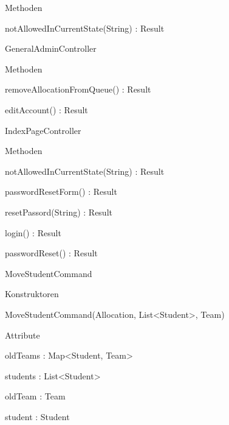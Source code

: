 \documentclass[parskip=full]{scrartcl}
\begin{document}
\begin{itemPackage}
\begin{itemClass}
\begin{itemClassSub}
\item Methoden
\begin{itemPlus}
\item notAllowedInCurrentState(String) : Result
\end{itemPlus}
\end{itemClassSub}
\item GeneralAdminController
\item \begin{itemClassSub}
\item Methoden
\begin{itemPlus}
\item removeAllocationFromQueue() : Result
\item editAccount() : Result
\end{itemPlus}
\end{itemClassSub}
\item IndexPageController
\item \begin{itemClassSub}
\item Methoden
\begin{itemPlus}
\item notAllowedInCurrentState(String) : Result
\item passwordResetForm() : Result
\item resetPassord(String) : Result
\end{itemPlus}
\begin{itemMinus}
\item login() : Result
\item passwordReset() : Result
\end{itemMinus}
\end{itemClassSub}
\item MoveStudentCommand
\begin{itemClassSub}
\item Konstruktoren
\begin{itemPlus}
\item MoveStudentCommand(Allocation, List<Student>, Team)
\end{itemPlus}
\item Attribute
\begin{itemPlus}
\item oldTeams : Map<Student, Team>
\item students : List<Student>
\end{itemPlus}
\begin{itemMinus}
\item oldTeam : Team
\item student : Student

\end{itemMinus}
\end{itemClassSub}
\end{itemClass}
\end{itemPackage}
\end{document}
